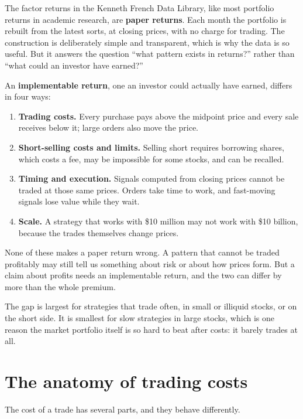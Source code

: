 The factor returns in the Kenneth French Data Library, like most portfolio returns in academic research, are \textbf{paper returns}. Each month the portfolio is rebuilt from the latest sorts, at closing prices, with no charge for trading. The construction is deliberately simple and transparent, which is why the data is so useful. But it answers the question ``what pattern exists in returns?'' rather than ``what could an investor have earned?''

An \textbf{implementable return}, one an investor could actually have earned, differs in four ways:

\begin{enumerate}
  \item \textbf{Trading costs.} Every purchase pays above the midpoint price and every sale receives below it; large orders also move the price.
  \item \textbf{Short-selling costs and limits.} Selling short requires borrowing shares, which costs a fee, may be impossible for some stocks, and can be recalled.
  \item \textbf{Timing and execution.} Signals computed from closing prices cannot be traded at those same prices. Orders take time to work, and fast-moving signals lose value while they wait.
  \item \textbf{Scale.} A strategy that works with \$10 million may not work with \$10 billion, because the trades themselves change prices.
\end{enumerate}

None of these makes a paper return wrong. A pattern that cannot be traded profitably may still tell us something about risk or about how prices form. But a claim about profits needs an implementable return, and the two can differ by more than the whole premium.

The gap is largest for strategies that trade often, in small or illiquid stocks, or on the short side. It is smallest for slow strategies in large stocks, which is one reason the market portfolio itself is so hard to beat after costs: it barely trades at all.

\section{The anatomy of trading costs}
\label{sec:17-anatomy}

The cost of a trade has several parts, and they behave differently.


